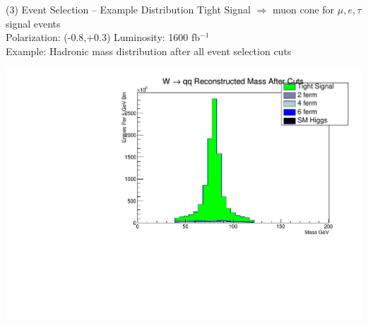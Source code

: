 \documentclass[10pt]{beamer}
\begin{document}
\begin{frame}{(3) Event Selection -- Example Distribution}
Tight Signal $\Rightarrow$  muon cone for $\mu,e,\tau$ signal events\\
Polarization: (-0.8,+0.3)\quad
Luminosity: 1600 fb$^{-1}$\\
Example: Hadronic mass distribution after all event selection cuts
\begin{center}
\includegraphics[scale=0.3, left]{mwhadCutsHist.pdf}
\end{center}



\end{frame}
\end{document}
